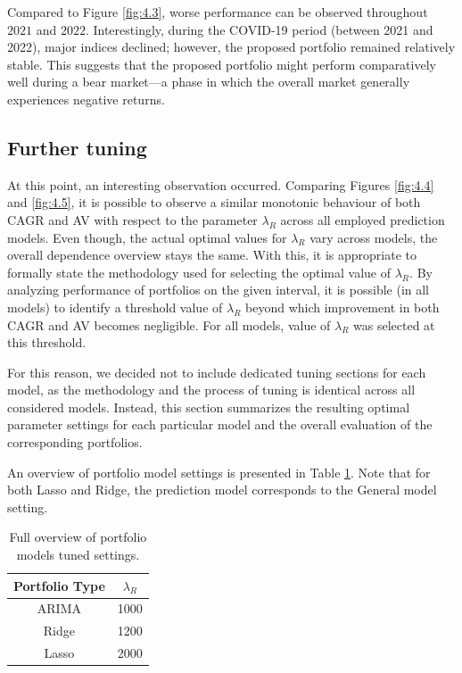 Compared to Figure \ref{fig:4.3}, worse performance can be observed throughout $2021$ and $2022$. Interestingly, during the COVID-19 period (between 2021 and 2022), major indices declined; however, the proposed portfolio remained relatively stable. This suggests that the proposed portfolio might perform comparatively well during a bear market—a phase in which the overall market generally experiences negative returns.

\subsection{Further tuning}
At this point, an interesting observation occurred. Comparing Figures \ref{fig:4.4} and \ref{fig:4.5}, it is possible to observe a similar monotonic behaviour of both CAGR and AV
with respect to the parameter $\lambda_R$ across all employed prediction models. Even though, the actual optimal values for $\lambda_R$ vary across models, the overall dependence overview stays the same.
With this, it is appropriate to formally state the methodology used for selecting the optimal value of $\lambda_R$. By analyzing performance of portfolios on the given interval,
it is possible (in all models) to identify a threshold value of $\lambda_R$ beyond which improvement in both CAGR and AV becomes negligible. For all models, value of $\lambda_R$ was selected at this threshold.

For this reason, we decided not to include dedicated tuning sections for each model, as the methodology and the process of tuning is identical across all considered models. Instead, this section
summarizes the resulting optimal parameter settings for each particular model and the overall evaluation of the corresponding portfolios.

An overview of portfolio model settings is presented in Table \ref{tab:settings}. Note that for both Lasso and Ridge, the prediction model corresponds to the General model setting.

\begin{table}[H]
\centering
\begin{tabular}{|c|c|}
\hline
\textbf{Portfolio Type} & $\lambda_R$ \\
\hline
ARIMA & 1000 \\
\hline
Ridge & 1200 \\
\hline
Lasso & 2000 \\
\hline
\end{tabular}
\caption{\centering Full overview of portfolio models tuned settings.}
\label{tab:settings}
\end{table}

